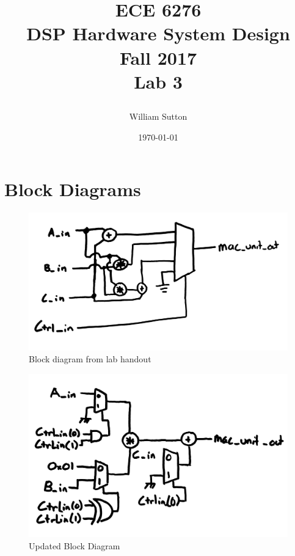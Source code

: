 \documentclass[11pt]{report}
\title{
		\Huge{
				\textbf{ECE 6276
						\\DSP Hardware System Design
						\\Fall 2017}}
			\\[2cm]
		\LARGE{
			\textnormal{Lab 3}}
			\\[1cm]
			\date{\today}
		\large{
			\author{William Sutton}
		}}
\begin{document}
\lstset{language=MATLAB}
\maketitle
	
\section*{Block Diagrams}
		\begin{figure}[!ht]
		 \caption*{Block diagram from lab handout }
		 \centering
     	 \includegraphics[width=.9\textwidth]{mac_block_diagram.jpg}
		\end{figure}	

\begin{figure}[!ht]
 		 \caption*{Updated Block Diagram}
  		 \centering
   	 \includegraphics[width=.9\textwidth]{mac_updated_block_diagram.jpg}
		\end{figure}
		
\newpage		
\end{document}
